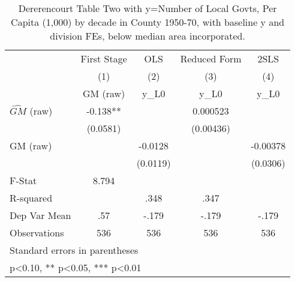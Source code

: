 \begin{table}[htbp]\centering
\def\sym#1{\ifmmode^{#1}\else\(^{#1}\)\fi}
\caption{Dererencourt Table Two with y=Number of Local Govts, Per Capita (1,000) by decade in County 1950-70, with baseline y and division FEs, below median area incorporated.}
\begin{tabular}{l*{4}{c}}
\toprule
                    & First Stage   &         OLS   &Reduced Form   &        2SLS   \\
                    &\multicolumn{1}{c}{(1)}&\multicolumn{1}{c}{(2)}&\multicolumn{1}{c}{(3)}&\multicolumn{1}{c}{(4)}\\
                    &\multicolumn{1}{c}{GM  (raw)}&\multicolumn{1}{c}{y\_L0}&\multicolumn{1}{c}{y\_L0}&\multicolumn{1}{c}{y\_L0}\\
\midrule
$\hat{GM}$ (raw)    &      -0.138** &               &    0.000523   &               \\
                    &    (0.0581)   &               &   (0.00436)   &               \\
\addlinespace
GM  (raw)           &               &     -0.0128   &               &    -0.00378   \\
                    &               &    (0.0119)   &               &    (0.0306)   \\
\midrule
F-Stat              &       8.794   &               &               &               \\
R-squared           &               &        .348   &        .347   &               \\
Dep Var Mean        &         .57   &       -.179   &       -.179   &       -.179   \\
Observations        &         536   &         536   &         536   &         536   \\
\bottomrule
\multicolumn{5}{l}{\footnotesize Standard errors in parentheses}\\
\multicolumn{5}{l}{\footnotesize * p<0.10, ** p<0.05, *** p<0.01}\\
\end{tabular}
\end{table}
